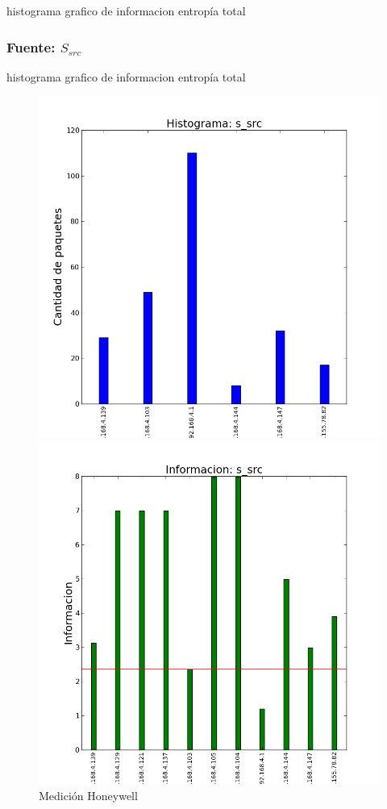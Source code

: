 \documentclass[10pt, a4paper]{article}
\begin{document}
histograma
grafico de informacion
entropía total

\subsubsection{Fuente: $S_{src}$}

histograma
grafico de informacion
entropía total

\begin{figure}[H]
   \begin{minipage}{0.5\linewidth}
     \includegraphics[width=\linewidth]{../imgs/prueba_laburo-ips_s_src_hist.png}
     \caption{Medición Honeywell}\label{fig:Honeywell-src-hist}
   \end{minipage}
  \hfill
   \begin{minipage}{0.5\linewidth}
     \includegraphics[width=\linewidth]{../imgs/prueba_laburo-ips_s_src_info.png}

\end{minipage}
\end{figure}
\end{document}
